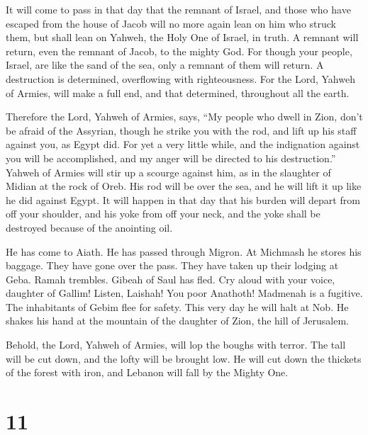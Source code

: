  It will come to pass in that day that the remnant of
Israel, and those who have escaped from the house of Jacob will no more
again lean on him who struck them, but shall lean on Yahweh, the Holy
One of Israel, in truth.  A remnant will return, even the
remnant of Jacob, to the mighty God.  For though your
people, Israel, are like the sand of the sea, only a remnant of them
will return. A destruction is determined, overflowing with
righteousness.  For the Lord, Yahweh of Armies, will make a
full end, and that determined, throughout all the earth.

 Therefore the Lord, Yahweh of Armies, says, ``My people
who dwell in Zion, don't be afraid of the Assyrian, though he strike you
with the rod, and lift up his staff against you, as Egypt did.
 For yet a very little while, and the indignation against
you will be accomplished, and my anger will be directed to his
destruction.''  Yahweh of Armies will stir up a scourge
against him, as in the slaughter of Midian at the rock of Oreb. His rod
will be over the sea, and he will lift it up like he did against Egypt.
 It will happen in that day that his burden will depart
from off your shoulder, and his yoke from off your neck, and the yoke
shall be destroyed because of the anointing oil.

 He has come to Aiath. He has passed through Migron. At
Michmash he stores his baggage.  They have gone over the
pass. They have taken up their lodging at Geba. Ramah trembles. Gibeah
of Saul has fled.  Cry aloud with your voice, daughter of
Gallim! Listen, Laishah! You poor Anathoth!  Madmenah is a
fugitive. The inhabitants of Gebim flee for safety.  This
very day he will halt at Nob. He shakes his hand at the mountain of the
daughter of Zion, the hill of Jerusalem.

 Behold, the Lord, Yahweh of Armies, will lop the boughs
with terror. The tall will be cut down, and the lofty will be brought
low.  He will cut down the thickets of the forest with
iron, and Lebanon will fall by the Mighty One.

\hypertarget{section-10}{%
\section{11}\label{section-10}}

